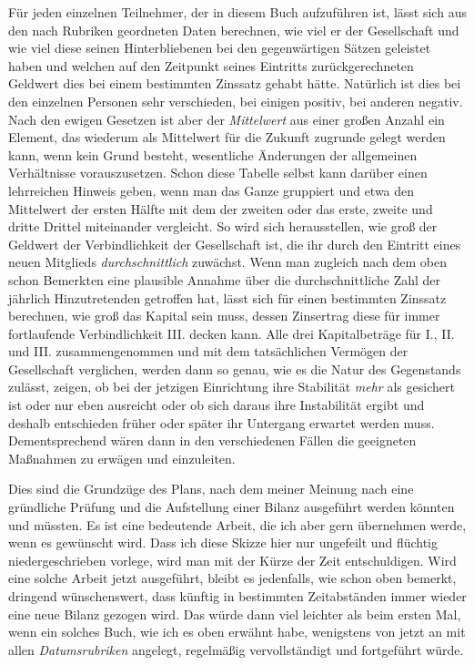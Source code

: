 Für jeden einzelnen Teilnehmer, der in diesem Buch aufzuführen ist, lässt sich aus den nach Rubriken geordneten Daten berechnen, wie viel er der Gesellschaft und wie viel diese seinen Hinterbliebenen bei den gegenwärtigen Sätzen geleistet haben und welchen auf den Zeitpunkt seines Eintritts zurückgerechneten Geldwert dies bei einem bestimmten Zinssatz gehabt hätte. Natürlich ist dies bei den einzelnen Personen sehr verschieden, bei einigen positiv, bei anderen negativ. Nach den ewigen Gesetzen ist aber der \textit{Mittelwert} aus einer großen Anzahl ein Element, das wiederum als Mittelwert für die Zukunft zugrunde gelegt werden kann, wenn kein Grund besteht, wesentliche Änderungen der allgemeinen Verhältnisse vorauszusetzen. Schon diese Tabelle selbst kann darüber einen lehrreichen Hinweis geben, wenn man das Ganze gruppiert und etwa den Mittelwert der ersten Hälfte mit dem der zweiten oder das erste, zweite und dritte Drittel miteinander vergleicht. So wird sich herausstellen, wie groß der Geldwert der Verbindlichkeit der Gesellschaft ist, die ihr durch den Eintritt eines neuen Mitglieds \textit{durchschnittlich} zuwächst. Wenn man zugleich nach dem oben schon Bemerkten eine plausible Annahme über die durchschnittliche Zahl der jährlich Hinzutretenden getroffen hat, lässt sich für einen bestimmten Zinssatz berechnen, wie groß das Kapital sein muss, dessen Zinsertrag diese für immer fortlaufende Verbindlichkeit III. decken kann. Alle drei Kapitalbeträge für I., II. und III. zusammengenommen und mit dem tatsächlichen Vermögen der Gesellschaft verglichen, werden dann so genau, wie es die Natur des Gegenstands zulässt, zeigen, ob bei der jetzigen Einrichtung ihre Stabilität \textit{mehr} als gesichert ist oder nur eben ausreicht oder ob sich daraus ihre Instabilität ergibt und deshalb entschieden früher oder später ihr Untergang erwartet werden muss. Dementsprechend wären dann in den verschiedenen Fällen die geeigneten Maßnahmen zu erwägen und einzuleiten.

Dies sind die Grundzüge des Plans, nach dem meiner Meinung nach eine gründliche Prüfung und die Aufstellung einer Bilanz ausgeführt werden könnten und müssten. Es ist eine bedeutende Arbeit, die ich aber gern übernehmen werde, wenn es gewünscht wird. Dass ich diese Skizze hier nur ungefeilt und flüchtig niedergeschrieben vorlege, wird man mit der Kürze der Zeit entschuldigen. Wird eine solche Arbeit jetzt ausgeführt, bleibt es jedenfalls, wie schon oben bemerkt, dringend wünschenswert, dass künftig in bestimmten Zeitabständen immer wieder eine neue Bilanz gezogen wird. Das würde dann viel leichter als beim ersten Mal, wenn ein solches Buch, wie ich es oben erwähnt habe, wenigstens von jetzt an mit allen \textit{Datumsrubriken} angelegt, regelmäßig vervollständigt und fortgeführt würde.

